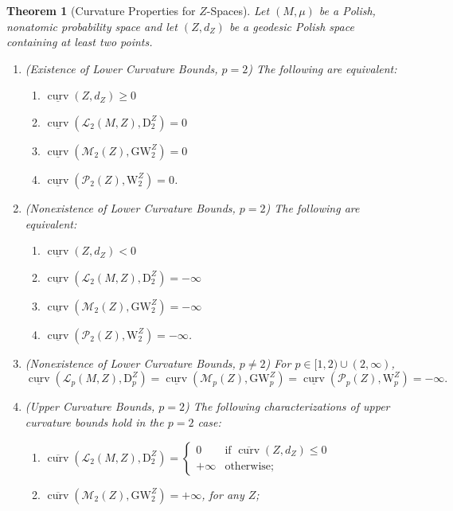 \documentclass{article}
\newtheorem{theorem}{Theorem}
\theoremstyle{definition}
\newcommand{\M}{\mathcal{M}}
\newcommand{\MZp}{\M_p(Z)}
\newcommand{\MZ}[1]{\M_{#1}(Z)}
\newcommand{\dgwz}{\mathrm{GW}_p^Z}
\newcommand{\dgw}[1]{\mathrm{GW}_{#1}^Z}
\newcommand{\WZ}{\mathcal{P}_p(Z)}
\newcommand{\WZp}[1]{\mathcal{P}_{#1}(Z)}
\newcommand{\wz}{\mathrm{W}_p^Z}
\newcommand{\wzp}[1]{\mathrm{W}_{#1}^Z}
\newcommand{\Lp}{\mathcal{L}_p}
\newcommand{\Lpp}[1]{\mathcal{L}_{#1}}
\newcommand{\dpz}{\mathrm{D}^Z_p}
\newcommand{\dz}[1]{\mathrm{D}^Z_{#1}}
\newcommand{\curv}{\underline{\operatorname{curv}}}
\newcommand{\curvupper}{\overline{\operatorname{curv}}}
\begin{document}
\begin{theorem}[Curvature Properties for $Z$-Spaces]\label{thm:curvature}
    Let $(M,\mu)$ be a Polish, nonatomic probability space and let $(Z,d_Z)$ be a geodesic Polish space containing at least two points.
    \begin{enumerate}[label=(\arabic*)]
        \item (Existence of Lower Curvature Bounds, $p=2$) The following are equivalent:
        \begin{enumerate}
            \item $\curv(Z,d_Z) \geq 0$
            \item $\curv(\Lpp{2}(M,Z),\dz{2}) = 0$
            \item $\curv(\MZ{2}, \dgw{2}) = 0$
            \item $\curv(\WZp{2},\wzp{2}) = 0$.
        \end{enumerate}
        \item (Nonexistence of Lower Curvature Bounds, $p=2$) The following are equivalent:
        \begin{enumerate}
            \item $\curv(Z,d_Z) < 0$
            \item $\curv(\Lpp{2}(M,Z),\dz{2}) = -\infty$
            \item $\curv(\MZ{2}, \dgw{2}) = -\infty$
            \item $\curv(\WZp{2},\wzp{2}) = -\infty$.
        \end{enumerate}
        \item (Nonexistence of Lower Curvature Bounds, $p \neq 2$) For $p \in [1,2) \cup (2,\infty)$,
        \[
        \curv(\Lp(M,Z),\dpz) = \curv(\MZp, \dgwz) = \curv(\WZ,\wz) = -\infty.
        \]
        \item (Upper Curvature Bounds, $p=2$) The following characterizations of upper curvature bounds hold in the $p=2$ case:
        \begin{enumerate}
            \item $\displaystyle \curvupper(\Lpp{2}(M,Z),\dz{2}) = \left\{\begin{array}{rl}
            0 & \mbox{if $\curvupper(Z,d_Z) \leq 0$}  \\
            +\infty & \mbox{otherwise;}
            \end{array}\right.$
            
            \item  $\curvupper(\MZ{2}, \dgw{2}) = + \infty$, for any $Z$;
            

\end{enumerate}
\end{enumerate}
\end{theorem}
\end{document}
